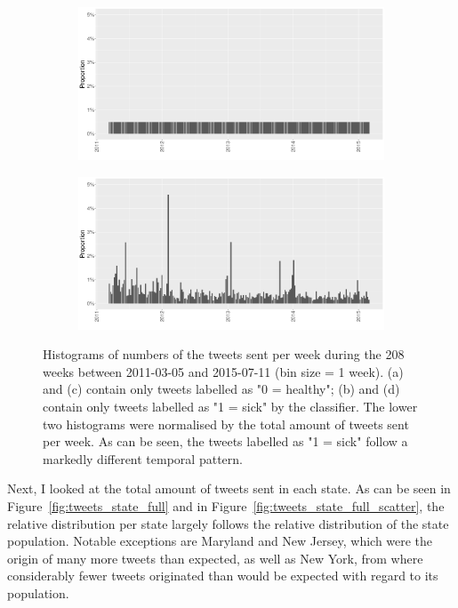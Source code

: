 \documentclass[11pt, a4paper]{article}\usepackage[]{graphicx}\usepackage[]{color}
\begin{document}
\begin{figure}[h]
    \begin{subfigure}[t]{0.49\textwidth}
  \includegraphics[width=1\linewidth]{activity_rel_healthy_date_Twitter_full_aggregated.png}
  \caption{}
  \end{subfigure}
  \hfill
    \begin{subfigure}[t]{0.49\textwidth}
  \includegraphics[width=1\linewidth]{activity_rel_sick_date_Twitter_full_aggregated.png}
  \caption{}
  \end{subfigure}
  \caption{Histograms of numbers of the tweets sent per week during the 208 weeks between 2011-03-05 and 2015-07-11 (bin size = 1 week). (a) and (c) contain only tweets labelled as "0 = healthy"; (b) and (d) contain only tweets labelled as "1 = sick" by the classifier. The lower two histograms were normalised by the total amount of tweets sent per week. As can be seen, the tweets labelled as "1 = sick" follow a markedly different temporal pattern.}
  \label{fig:tweets_seasonal_healthy_sick}
\end{figure}

Next, I looked at the total amount of tweets sent in each state. As can be seen in Figure~\ref{fig:tweets_state_full} and in Figure~\ref{fig:tweets_state_full_scatter}, the relative distribution per state largely follows the relative distribution of the state population. Notable exceptions are Maryland and New Jersey, which were the origin of many more tweets than expected, as well as New York, from where considerably fewer tweets originated than would be expected with regard to its population.\newline
\end{document}
